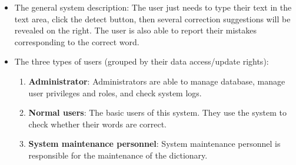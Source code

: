 
\begin{itemize} 
\item{The general system description: } 
The user just needs to type their text in the text area, click the detect button, then several correction suggestions will be revealed on the right. The user is also able to report their mistakes corresponding to the correct word.
\item{The three types of users (grouped by their data access/update rights): }
\begin{enumerate}
	\item {\textbf{Administrator}: Administrators are able to manage database, manage user privileges and roles, and check system logs.}
	\item {\textbf{Normal users}: The basic users of this system. They use the system to check whether their words are correct.}
	\item {\textbf{System maintenance personnel}: System maintenance personnel is responsible for the maintenance of the dictionary.}
\end{enumerate}


\end{itemize}
